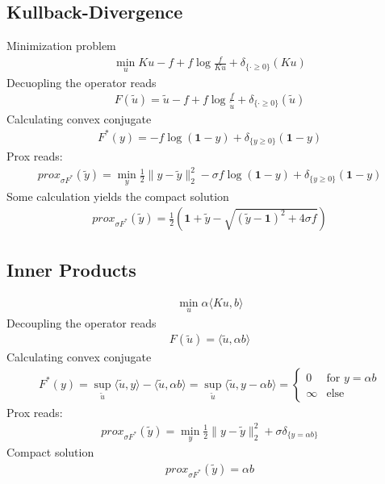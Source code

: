 \documentclass[final,leqno,onefignum,onetabnum]{article}
\newcommand{\1}[1]{\mathds{1}_{#1}}
\begin{document}
\subsection{Kullback-Divergence}
Minimization problem
\begin{align}
\min_u Ku-f+f\log\frac{f}{Ku} + \delta_{\{ \cdot\geq 0 \}}(Ku)	
\end{align}
Decuopling the operator reads
\begin{align}
	F(\tilde{u}) = \tilde{u}-f+f\log\frac{f}{\tilde{u}} + \delta_{\{ \cdot\geq 0 \}}(\tilde{u})	
\end{align}
Calculating convex conjugate
\begin{align}
F^*(y) = -f\log(\boldsymbol{1}-y) + \delta_{\{ y\geq 0 \}}(\boldsymbol{1}-y)	
\end{align}
Prox reads:
\begin{align}
prox_{\sigma F^*}(\tilde{y}) = \min_y \frac{1}{2}\|y-\tilde{y}\|_2^2 -\sigma f\log(\boldsymbol{1}-y) + \delta_{\{ y\geq 0 \}}(\boldsymbol{1}-y)
\end{align}
Some calculation yields the compact solution
\begin{align}
prox_{\sigma F^*}(\tilde{y}) = \frac{1}{2}\left( \boldsymbol{1} + \tilde{y} - \sqrt{ (\tilde{y}-\boldsymbol{1})^2 + 4\sigma f }\right) 
\end{align}

\subsection{Inner Products}
\begin{align}
	\min_u \alpha\langle Ku,b\rangle
\end{align}
Decoupling the operator reads
\begin{align}
	F(\tilde{u}) = \langle\tilde{u},\alpha b\rangle
\end{align}
Calculating convex conjugate
\begin{align}
	F^*(y) = \sup_{\tilde{u}} \langle\tilde{u},y\rangle -\langle\tilde{u},\alpha b\rangle = \sup_{\tilde{u}} \langle\tilde{u},y - \alpha b\rangle = \begin{cases}0&\text{for } y=\alpha b\\\infty&\text{else}\end{cases}
\end{align}
Prox reads:
\begin{align}
prox_{\sigma F^*}(\tilde{y}) = \min_y \frac{1}{2}\|y-\tilde{y}\|_2^2 +\sigma \delta_{\{ y = \alpha b \}}
\end{align}
Compact solution
\begin{align}
prox_{\sigma F^*}(\tilde{y}) = \alpha b
\end{align}
\listoftodos

%
%
	
\end{document}
